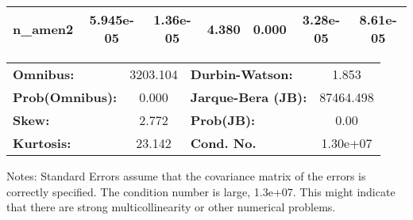 \begin{center}
\begin{tabular}{lcccccc}
\textbf{n\_amen2}                 &    5.945e-05  &     1.36e-05     &     4.380  &         0.000        &     3.28e-05    &     8.61e-05     \\
\bottomrule
\end{tabular}
\begin{tabular}{lclc}
\textbf{Omnibus:}       & 3203.104 & \textbf{  Durbin-Watson:     } &     1.853  \\
\textbf{Prob(Omnibus):} &   0.000  & \textbf{  Jarque-Bera (JB):  } & 87464.498  \\
\textbf{Skew:}          &   2.772  & \textbf{  Prob(JB):          } &      0.00  \\
\textbf{Kurtosis:}      &  23.142  & \textbf{  Cond. No.          } &  1.30e+07  \\
\bottomrule
\end{tabular}
\end{center}

Notes: \newline
 [1] Standard Errors assume that the covariance matrix of the errors is correctly specified. \newline
 [2] The condition number is large, 1.3e+07. This might indicate that there are \newline
 strong multicollinearity or other numerical problems.